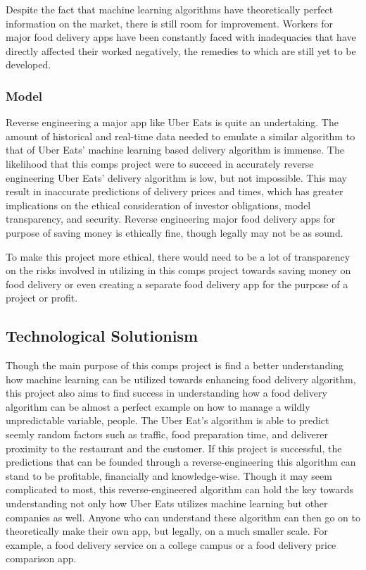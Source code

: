 \documentclass[10pt,twocolumn]{article}
\begin{document}
Despite the fact that machine learning algorithms have theoretically perfect information on the market, there is still room for improvement. Workers for major food delivery apps have been constantly faced with inadequacies that have directly affected their worked negatively, the remedies to which are still yet to be developed.  

\subsubsection{Model}

Reverse engineering a major app like Uber Eats is quite an undertaking. The amount of historical and real-time data needed to emulate a similar algorithm to that of Uber Eats' machine learning based delivery algorithm is immense. The likelihood that this comps project were to succeed in accurately reverse engineering Uber Eats' delivery algorithm is low, but not impossible. This may result in inaccurate predictions of delivery prices and times, which has greater implications on the ethical consideration of investor obligations, model transparency, and security. Reverse engineering major food delivery apps for purpose of saving money is ethically fine, though legally may not be as sound.

To make this project more ethical, there would need to be a lot of transparency on the risks involved in utilizing in this comps project towards saving money on food delivery or even creating a separate food delivery app for the purpose of a project or profit.

\subsection{Technological Solutionism}

Though the main purpose of this comps project is find a better understanding how machine learning can be utilized towards enhancing food delivery algorithm, this project also aims to find success in understanding how a food delivery algorithm can be almost a perfect example on how to manage a wildly unpredictable variable, people. The Uber Eat's algorithm is able to predict seemly random factors such as traffic, food preparation time, and deliverer proximity to the restaurant and the customer. If this project is successful, the predictions that can be founded through a reverse-engineering this algorithm can stand to be profitable, financially and knowledge-wise. Though it may seem complicated to most, this reverse-engineered algorithm can hold the key towards understanding not only how Uber Eats utilizes machine learning but other companies as well. Anyone who can understand these algorithm can then go on to theoretically make their own app, but legally, on a much smaller scale. For example, a food delivery service on a college campus or a food delivery price comparison app.
\end{document}
